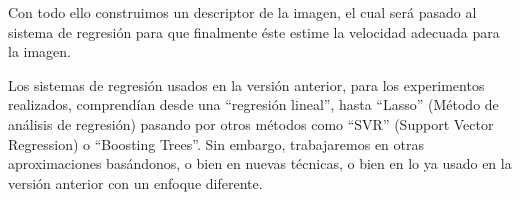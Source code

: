 \documentclass[12pt,oneside,a4paper]{article}
\begin{document}
Con todo ello construimos un descriptor de la imagen, el cual será pasado al sistema de regresión para que finalmente éste estime la velocidad adecuada para la imagen.

Los sistemas de regresión usados en la versión anterior, para los experimentos realizados, comprendían desde una ``regresión lineal'', hasta ``Lasso'' (Método de análisis de regresión) pasando por otros métodos como ``SVR'' (Support Vector Regression) o ``Boosting Trees''. Sin embargo, trabajaremos en otras aproximaciones basándonos, o bien en nuevas técnicas, o bien en lo ya usado en la versión anterior con un enfoque diferente. 








\end{document}
